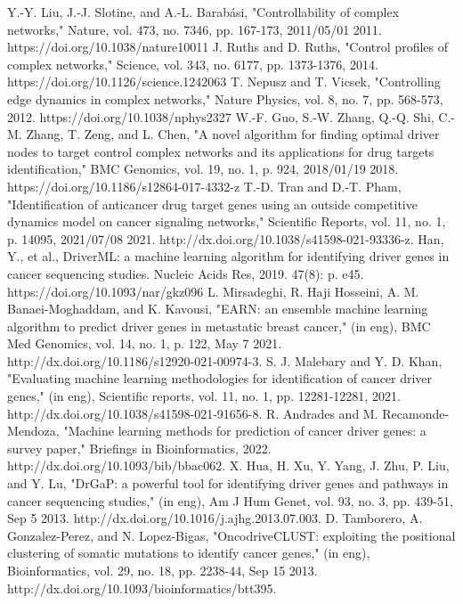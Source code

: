 \documentclass[5p,,preprint,12pt]{elsarticle}
\begin{document}
\begin{thebibliography}{71}
	Y.-Y. Liu, J.-J. Slotine, and A.-L. Barabási, "Controllability of complex networks," Nature, vol. 473, no. 7346, pp. 167-173, 2011/05/01 2011. https://doi.org/10.1038/nature10011
	J. Ruths and D. Ruths, "Control profiles of complex networks," Science, vol. 343, no. 6177, pp. 1373-1376, 2014. https://doi.org/10.1126/science.1242063
	T. Nepusz and T. Vicsek, "Controlling edge dynamics in complex networks," Nature Physics, vol. 8, no. 7, pp. 568-573, 2012. https://doi.org/10.1038/nphys2327
	W.-F. Guo, S.-W. Zhang, Q.-Q. Shi, C.-M. Zhang, T. Zeng, and L. Chen, "A novel algorithm for finding optimal driver nodes to target control complex networks and its applications for drug targets identification," BMC Genomics, vol. 19, no. 1, p. 924, 2018/01/19 2018. https://doi.org/10.1186/s12864-017-4332-z
	T.-D. Tran and D.-T. Pham, "Identification of anticancer drug target genes using an outside competitive dynamics model on cancer signaling networks," Scientific Reports, vol. 11, no. 1, p. 14095, 2021/07/08 2021. http://dx.doi.org/10.1038/s41598-021-93336-z.
	Han, Y., et al., DriverML: a machine learning algorithm for identifying driver genes in cancer sequencing studies. Nucleic Acids Res, 2019. 47(8): p. e45. https://doi.org/10.1093/nar/gkz096
	L. Mirsadeghi, R. Haji Hosseini, A. M. Banaei-Moghaddam, and K. Kavousi, "EARN: an ensemble machine learning algorithm to predict driver genes in metastatic breast cancer," (in eng), BMC Med Genomics, vol. 14, no. 1, p. 122, May 7 2021. http://dx.doi.org/10.1186/s12920-021-00974-3.
	S. J. Malebary and Y. D. Khan, "Evaluating machine learning methodologies for identification of cancer driver genes," (in eng), Scientific reports, vol. 11, no. 1, pp. 12281-12281, 2021. http://dx.doi.org/10.1038/s41598-021-91656-8.
	R. Andrades and M. Recamonde-Mendoza, "Machine learning methods for prediction of cancer driver genes: a survey paper," Briefings in Bioinformatics, 2022. http://dx.doi.org/10.1093/bib/bbac062.
	X. Hua, H. Xu, Y. Yang, J. Zhu, P. Liu, and Y. Lu, "DrGaP: a powerful tool for identifying driver genes and pathways in cancer sequencing studies," (in eng), Am J Hum Genet, vol. 93, no. 3, pp. 439-51, Sep 5 2013. http://dx.doi.org/10.1016/j.ajhg.2013.07.003.
	D. Tamborero, A. Gonzalez-Perez, and N. Lopez-Bigas, "OncodriveCLUST: exploiting the positional clustering of somatic mutations to identify cancer genes," (in eng), Bioinformatics, vol. 29, no. 18, pp. 2238-44, Sep 15 2013. http://dx.doi.org/10.1093/bioinformatics/btt395.

\end{thebibliography}
\end{document}
